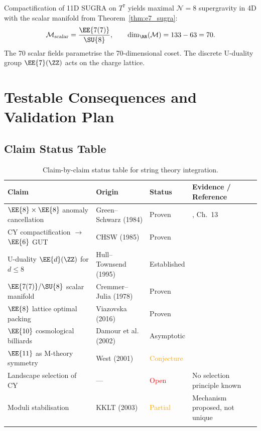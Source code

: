 Compactification of 11D SUGRA on $T^7$ yields maximal $\mathcal{N}=8$
supergravity in 4D with the scalar manifold from
Theorem~\ref{thm:e7_sugra}:
\begin{equation}
\mathcal{M}_{\mathrm{scalar}} = \frac{\EE{7(7)}}{\SU{8}},
\qquad \dim_\RR(\mathcal{M}) = 133 - 63 = 70.
\end{equation}
The 70 scalar fields parametrise the 70-dimensional coset.  The discrete
U-duality group $\EE{7}(\ZZ)$ acts on the charge lattice.

\section{Testable Consequences and Validation Plan}
\label{sec:testable}

\subsection{Claim Status Table}

\begin{longtable}{p{4cm}p{3cm}p{2cm}p{4cm}}
\toprule
\textbf{Claim} & \textbf{Origin} & \textbf{Status} & \textbf{Evidence / Reference} \\
\midrule
\endhead
$\EE{8}\times\EE{8}$ anomaly cancellation &
    Green--Schwarz (1984) &
    \textcolor{validcolor}{Proven} &
    \cite{green2012superstring}, Ch.~13 \\
CY compactification $\to$ $\EE{6}$ GUT &
    CHSW (1985) &
    \textcolor{validcolor}{Proven} &
    \cite{candelas1985vacuum} \\
U-duality $\EE{d}(\ZZ)$ for $d \le 8$ &
    Hull--Townsend (1995) &
    \textcolor{validcolor}{Established} &
    \cite{hull1995unity} \\
$\EE{7(7)}/\SU{8}$ scalar manifold &
    Cremmer--Julia (1978) &
    \textcolor{validcolor}{Proven} &
    \cite{cremmer1978} \\
$\EE{8}$ lattice optimal packing &
    Viazovska (2016) &
    \textcolor{validcolor}{Proven} &
    \cite{cohn2017sphere} \\
$\EE{10}$ cosmological billiards &
    Damour et al. (2002) &
    \textcolor{validcolor}{Asymptotic} &
    \cite{damour2002e10} \\
$\EE{11}$ as M-theory symmetry &
    West (2001) &
    \textcolor{orange}{Conjecture} &
    \cite{west2001e11} \\
Landscape selection of CY &
    --- &
    \textcolor{red}{Open} &
    No selection principle known \\
Moduli stabilisation &
    KKLT (2003) &
    \textcolor{orange}{Partial} &
    Mechanism proposed, not unique \\
\bottomrule
\caption{Claim-by-claim status table for string theory integration.}
\label{tab:claim_status}
\end{longtable}

